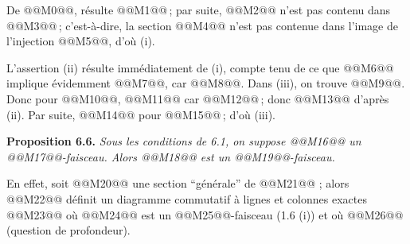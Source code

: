 
De @@M0@@, r\'esulte @@M1@@\,; par suite, @@M2@@ n'est pas contenu dans @@M3@@\,; c'est-\`a-dire, la section @@M4@@ n'est pas contenue dans l'image de l'injection @@M5@@, d'o\`u (i).

L'assertion (ii) r\'esulte imm\'ediatement de (i), compte tenu de ce que @@M6@@ implique \'evidemment @@M7@@, car @@M8@@. Dans (iii), on trouve @@M9@@. Donc pour @@M10@@, @@M11@@ car @@M12@@\,; donc @@M13@@ d'apr\`es (ii). Par suite, @@M14@@ pour @@M15@@\,; d'o\`u (iii).

\textbf{Proposition 6.6.} \emph{Sous les conditions de 6.1, on suppose @@M16@@ un @@M17@@-faisceau. Alors @@M18@@ est un @@M19@@-faisceau.}

En effet, soit @@M20@@ une section ``g\'en\'erale'' de @@M21@@ ; alors @@M22@@ d\'efinit un diagramme commutatif \`a lignes et colonnes exactes
@@M23@@
o\`u @@M24@@ est un @@M25@@-faisceau (1.6 (i)) et o\`u @@M26@@ (question de profondeur).
